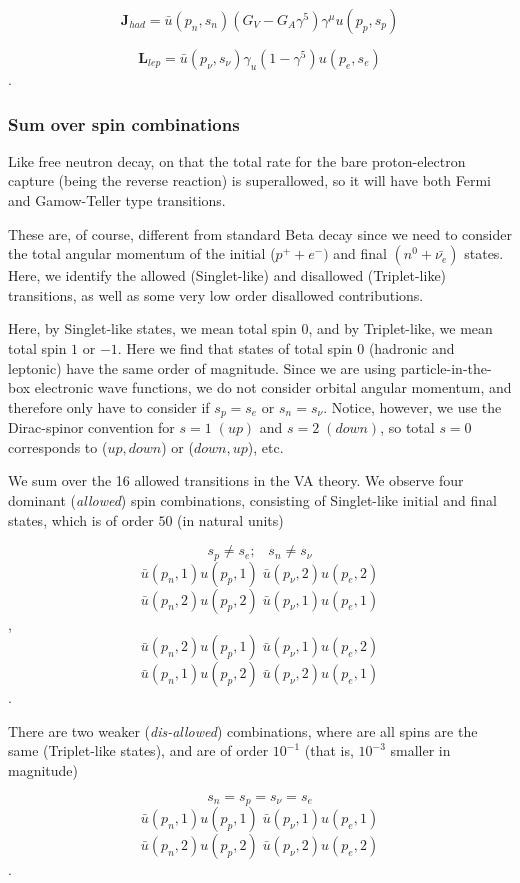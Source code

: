 \documentclass[%
 aip,
 jmp,%
 amsmath,amssymb,
 reprint,%
]{revtex4-1}
\begin{document}
$$\mathbf{J}_{had}=\bar{u}(p_{n},s_{n})(G_{V}-G_{A}\gamma^{5})\gamma^{\mu}u(p_{p},s_{p})$$

$$\mathbf{L}_{lep}=\bar{u}(p_{\nu},s_{\nu})\gamma_{u}(1-\gamma^{5})u(p_{e},s_{e})$$.

\subsubsection{Sum over spin combinations}

Like free neutron decay, on that the total  rate for the bare proton-electron capture (being the reverse reaction)  is superallowed, so it will have both Fermi and Gamow-Teller type transitions.

These are, of course, different from standard Beta decay since we need to consider the total angular momentum of the initial ($p^{+}+e^{-})$ and final $(n^{0}+\bar{\nu_{e}})$ states.  
Here, we identify the allowed (Singlet-like) and disallowed (Triplet-like) transitions, as well as some very low order disallowed contributions.  


Here, by Singlet-like states, we  mean total spin 0, and by Triplet-like, we mean total  spin $1$ or $-1$.  Here we find that states of total spin 0 (hadronic and leptonic) have the same order of magnitude.   Since we are using particle-in-the-box electronic wave functions,  we do not consider orbital angular momentum, and therefore only have to consider if $s_{p}=s_{e}$ or  $s_{n}=s_{\nu}$. Notice, however, we use the Dirac-spinor convention for $s=1\;(up)$ and $s=2\;(down)$, so total $s=0$ corresponds to ($up,down$) or ($down,up$), etc.


We sum over the 16  allowed transitions in the VA theory.  
We observe four dominant (\emph{allowed}) spin combinations, 
consisting of Singlet-like initial and final states,  which is of order $50$ (in natural units)

$$s_{p}\neq s{_e};\;\;\;s_{n}\neq s_{\nu}$$
$$\bar{u}(p_{n},1)u(p_{p},1)\;\bar{u}(p_{\nu},2)u(p_{e},2)$$
$$\bar{u}(p_{n},2)u(p_{p},2)\;\bar{u}(p_{\nu},1)u(p_{e},1)$$,
$$\bar{u}(p_{n},2)u(p_{p},1)\;\bar{u}(p_{\nu},1)u(p_{e},2)$$
$$\bar{u}(p_{n},1)u(p_{p},2)\;\bar{u}(p_{\nu},2)u(p_{e},1)$$.

There are two weaker (\emph{dis-allowed}) combinations, 
where are all spins are the same (Triplet-like states), and are of order $10^{-1}$ (that is, $10^{-3}$ smaller in magnitude)

$$s_{n}=s_{p}=s_{\nu}=s{_e}$$
$$\bar{u}(p_{n},1)u(p_{p},1)\;\bar{u}(p_{\nu},1)u(p_{e},1)$$
$$\bar{u}(p_{n},2)u(p_{p},2)\;\bar{u}(p_{\nu},2)u(p_{e},2)$$.
\end{document}
